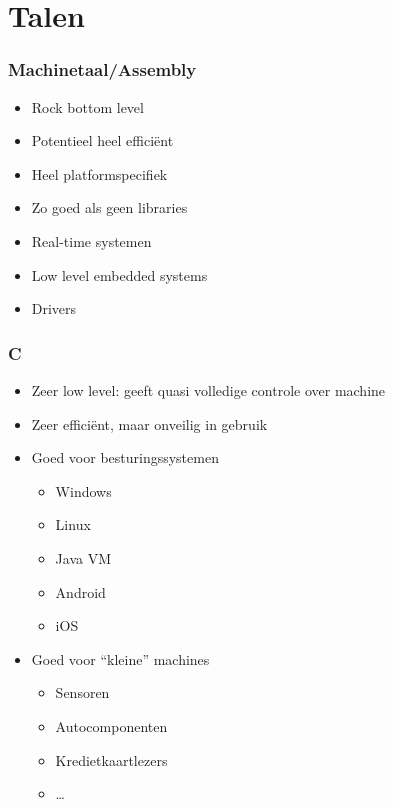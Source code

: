 \section{Talen}

\begin{frame}
  \tableofcontents[currentsection]
\end{frame}

\begin{frame}
  \frametitle{Machinetaal/Assembly}
  \begin{itemize}
    \item Rock bottom level
    \item Potentieel heel effici\"ent
    \item Heel platformspecifiek
    \item Zo goed als geen libraries
  \end{itemize}
  \vskip4mm
  \begin{itemize}
    \item Real-time systemen
    \item Low level embedded systems
    \item Drivers
  \end{itemize}
\end{frame}

\begin{frame}
  \frametitle{C}
  \begin{itemize}
    \item Zeer low level: geeft quasi volledige controle over machine
    \item Zeer effici\"ent, maar onveilig in gebruik
  \end{itemize}
  \vskip4mm
  \begin{itemize}
    \item Goed voor besturingssystemen
          \begin{itemize}
            \item Windows
            \item Linux
            \item Java VM
            \item Android
            \item iOS
          \end{itemize}
    \item Goed voor ``kleine'' machines
          \begin{itemize}
            \item Sensoren
            \item Autocomponenten
            \item Kredietkaartlezers
            \item \dots
          \end{itemize}
  \end{itemize}
\end{frame}

